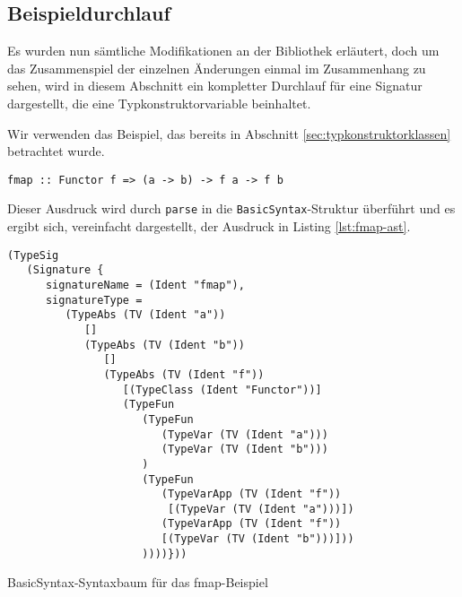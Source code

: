 
\subsection{Beispieldurchlauf}

Es wurden nun sämtliche Modifikationen an der Bibliothek erläutert, doch um das Zusammenspiel der einzelnen Änderungen
einmal im Zusammenhang zu sehen, wird in diesem Abschnitt ein kompletter Durchlauf für eine Signatur dargestellt, die eine
Typkonstruktorvariable beinhaltet.


Wir verwenden das Beispiel, das bereits in Abschnitt \ref{sec:typkonstruktorklassen} betrachtet wurde.

\begin{verbatim}
fmap :: Functor f => (a -> b) -> f a -> f b
\end{verbatim}

Dieser Ausdruck wird durch \texttt{parse} in die \texttt{BasicSyntax}-Struktur überführt und es ergibt sich, vereinfacht dargestellt,
der Ausdruck in Listing \ref{lst:fmap-ast}.

\begin{listing}[ht]
\begin{verbatim}
(TypeSig
   (Signature {
      signatureName = (Ident "fmap"),
      signatureType =
         (TypeAbs (TV (Ident "a"))
            []
            (TypeAbs (TV (Ident "b"))
               []
               (TypeAbs (TV (Ident "f"))
                  [(TypeClass (Ident "Functor"))]
                  (TypeFun
                     (TypeFun
                        (TypeVar (TV (Ident "a")))
                        (TypeVar (TV (Ident "b")))
                     )
                     (TypeFun
                        (TypeVarApp (TV (Ident "f"))
                         [(TypeVar (TV (Ident "a")))])
                        (TypeVarApp (TV (Ident "f"))
                        [(TypeVar (TV (Ident "b")))]))
                     ))))}))
\end{verbatim}
\caption{BasicSyntax-Syntaxbaum für das fmap-Beispiel}
\label{lst:fmap-ast}
\end{listing}

